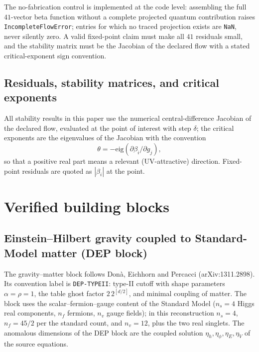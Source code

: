 \documentclass[11pt]{article}
\begin{document}
The no-fabrication control is implemented at the code level: assembling the
full $41$-vector beta function without a complete projected quantum
contribution raises \texttt{IncompleteFlowError}; entries for which no traced
projection exists are \texttt{NaN}, never silently zero.  A valid fixed-point
claim must make all $41$ residuals small, and the stability matrix must be the
Jacobian of the declared flow with a stated critical-exponent sign
convention.

\subsection{Residuals, stability matrices, and critical exponents}
\label{sec:methods}

All stability results in this paper use the numerical central-difference
Jacobian of the declared flow, evaluated at the point of interest with step
$\delta$; the critical exponents are the eigenvalues of the Jacobian with the
convention
\begin{equation}
  \label{eq:theta}
  \theta = -\mathrm{eig}\!\left(\partial \beta_i/\partial g_j\right),
\end{equation}
so that a positive real part means a relevant (UV-attractive) direction.
Fixed-point residuals are quoted as $|\beta_i|$ at the point.

\section{Verified building blocks}
\label{sec:blocks}

\subsection{Einstein--Hilbert gravity coupled to Standard-Model matter
(DEP block)}
\label{sec:dep}

The gravity--matter block follows Don\`a, Eichhorn and Percacci
\cite{dep14} (arXiv:1311.2898).  Its convention label is
\texttt{DEP-TYPEII}: type-II cutoff with shape parameters $\alpha=\rho=1$, the
table ghost factor $2\,2^{[d/2]}$, and minimal coupling of matter.  The block
uses the scalar--fermion--gauge content of the Standard Model ($n_s=4$ Higgs
real components, $n_f$ fermions, $n_v$ gauge fields); in this reconstruction
$n_s=4$, $n_f=45/2$ per the standard count, and $n_v=12$, plus the two real
singlets.  The anomalous dimensions of the DEP block are the coupled solution
$\eta_h,\eta_\phi,\eta_E,\eta_V$ of the source equations.
\end{document}
